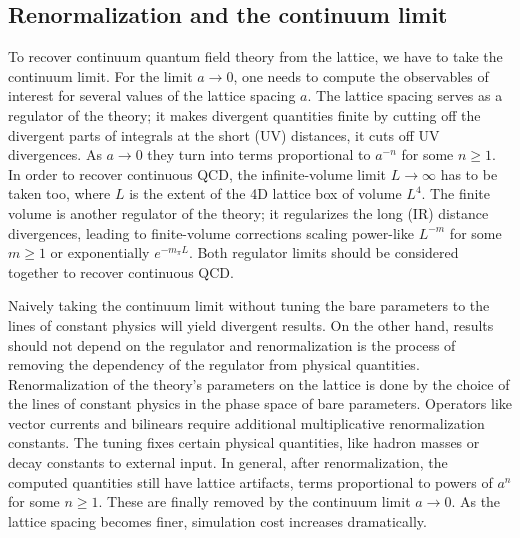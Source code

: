 

\subsection{Renormalization and the continuum limit}


To recover continuum quantum field theory from the lattice, we have to take the continuum limit.
For the limit $a \to 0$, one needs to compute the observables of interest for several values of the lattice spacing $a$.
The lattice spacing serves as a regulator of the theory; it makes divergent quantities finite by cutting off the divergent parts of integrals at the short (UV) distances, \ie it cuts off UV divergences.
As $a \to 0$ they turn into terms proportional to $a^{-n}$ for some $n \geq 1$.
In order to recover continuous QCD, the infinite-volume limit $L \to \infty$ has to be taken too, where $L$ is the extent of the 4D lattice box of volume $L^{4}$.
The finite volume is another regulator of the theory; it regularizes the long (IR) distance divergences, leading to finite-volume corrections scaling power-like $L^{-m}$ for some $m \geq 1$ or exponentially $e^{-m_{\pi} L}$.
Both regulator limits should be considered together to recover continuous QCD.

Naively taking the continuum limit without tuning the bare parameters to the lines of constant physics will yield divergent results.
On the other hand, results should not depend on the regulator and renormalization is the process of removing the dependency of the regulator from physical quantities.
Renormalization of the theory's parameters on the lattice is done by the choice of the lines of constant physics in the phase space of bare parameters.
Operators like vector currents and bilinears require additional multiplicative renormalization constants.
The tuning fixes certain physical quantities, like hadron masses or decay constants to external input.
In general, after renormalization, the computed quantities still have lattice artifacts, \ie terms proportional to powers of $a^{n}$ for some $n \geq 1$.
These are finally removed by the continuum limit $a \to 0$.
As the lattice spacing becomes finer, simulation cost increases dramatically.

